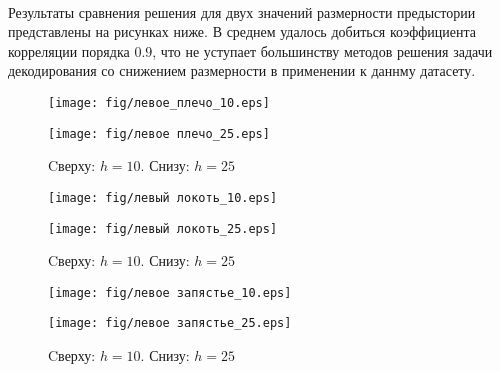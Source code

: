\documentclass[12pt]{article}
\begin{document}
\paragraph{} 
Результаты сравнения решения для двух значений размерности предыстории представлены на рисунках ниже. В среднем удалось добиться коэффициента корреляции порядка $0.9$, что не уступает большинству методов решения задачи декодирования со снижением размерности в применении к даннму датасету.


\newpage

\begin{figure}[h!]
    \captionsetup{labelformat=empty}
    \centering
    \texttt{[image: fig/левое\_плечо\_10.eps]}
\end{figure}

\begin{figure}[h]
    \centering
    \texttt{[image: fig/левое плечо\_25.eps]}
    \caption{Cверху: $h = 10$. Снизу: $h = 25$}
\end{figure}


\newpage

\vspace{3cm}

\begin{figure}[h]
    \captionsetup{labelformat=empty}
    \centering
    \texttt{[image: fig/левый локоть\_10.eps]}
\end{figure}

\begin{figure}[h]
    \centering
    \texttt{[image: fig/левый локоть\_25.eps]}
    \caption{Cверху: $h = 10$. Снизу: $h = 25$}
\end{figure}

\newpage

\begin{figure}[h]
    \captionsetup{labelformat=empty}
    \centering
    \texttt{[image: fig/левое запястье\_10.eps]}
\end{figure}

\begin{figure}[h]
    \centering
    \texttt{[image: fig/левое запястье\_25.eps]}
    \caption{Cверху: $h = 10$. Снизу: $h = 25$}
\end{figure}


\end{document}
